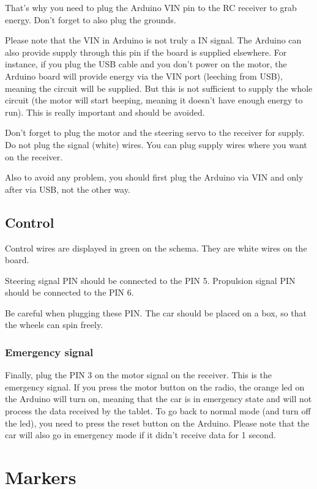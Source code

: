 \documentclass[a4paper,11pt]{report}
\begin{document}
That's why you need to plug the Arduino VIN pin to the RC receiver to grab
energy. Don't forget to also plug the grounds.

Please note that the VIN in Arduino is not truly a IN signal. The Arduino can
also provide supply through this pin if the board is supplied elsewhere. For
instance, if you plug the USB cable and you don't power on the motor, the
Arduino board will provide energy via the VIN port (leeching from USB), meaning
the circuit will be supplied. But this is not sufficient to supply the whole
circuit (the motor will start beeping, meaning it doesn't have enough energy to
run). This is really important and should be avoided.

Don't forget to plug the motor and the steering servo to the receiver for
supply. Do not plug the signal (white) wires. You can plug supply wires where
you want on the receiver.

Also to avoid any problem, you should first plug the Arduino via VIN and only
after via USB, not the other way.

\subsection{Control}

Control wires are displayed in green on the schema. They are white wires on the
board.

Steering signal PIN should be connected to the PIN 5.
Propulsion signal PIN should be connected to the PIN 6.

Be careful when plugging these PIN. The car should be placed on a box, so that
the wheels can spin freely.

\subsubsection{Emergency signal}

Finally, plug the PIN 3 on the motor signal on the receiver. This is the
emergency signal. If you press the motor button on the radio, the orange led on
the Arduino will turn on, meaning that the car is in emergency state and will not
process the data received by the tablet. To go back to normal mode (and turn
off the led), you need to press the reset button on the Arduino. Please note
that the car will also go in emergency mode if it didn't receive data for 1
second.

\section{Markers}
\end{document}
